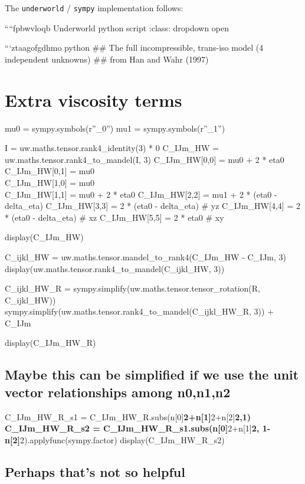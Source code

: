 \documentclass[
  letterpaper,
  DIV=11,
  numbers=noendperiod]{scrreprt}
\begin{document}
The \texttt{underworld} / \texttt{sympy} implementation follows:

````fpbwvloqb Underworld python script :class: dropdown open

```ztaagofgdhmo python \#\# The full incompressible, trans-iso model (4
independent unknowns) \#\# from Han and Wahr (1997)

\chapter{Extra viscosity terms}\label{extra-viscosity-terms}

mu0 = sympy.symbols(r''\mu\_0'') mu1 = sympy.symbols(r''\mu\_1'')

I = uw.maths.tensor.rank4\_identity(3) * 0 C\_IJm\_HW =
uw.maths.tensor.rank4\_to\_mandel(I, 3) C\_IJm\_HW{[}0,0{]} = mu0 + 2 *
eta0 C\_IJm\_HW{[}0,1{]} = mu0\\
C\_IJm\_HW{[}1,0{]} = mu0\\
C\_IJm\_HW{[}1,1{]} = mu0 + 2 * eta0 C\_IJm\_HW{[}2,2{]} = mu1 + 2 *
(eta0 - delta\_eta) C\_IJm\_HW{[}3,3{]} = 2 * (eta0 - delta\_eta) \# yz
C\_IJm\_HW{[}4,4{]} = 2 * (eta0 - delta\_eta) \# xz C\_IJm\_HW{[}5,5{]}
= 2 * eta0 \# xy

display(C\_IJm\_HW)

C\_ijkl\_HW = uw.maths.tensor.mandel\_to\_rank4(C\_IJm\_HW - C\_IJm, 3)
display(uw.maths.tensor.rank4\_to\_mandel(C\_ijkl\_HW, 3))

C\_ijkl\_HW\_R = sympy.simplify(uw.maths.tensor.tensor\_rotation(R,
C\_ijkl\_HW))
sympy.simplify(uw.maths.tensor.rank4\_to\_mandel(C\_ijkl\_HW\_R, 3)) +
C\_IJm

display(C\_IJm\_HW\_R)

\section{Maybe this can be simplified if we use the unit vector
relationships among
n0,n1,n2}\label{maybe-this-can-be-simplified-if-we-use-the-unit-vector-relationships-among-n0n1n2}

C\_IJm\_HW\_R\_s1 =
C\_IJm\_HW\_R.subs(n{[}0{]}\textbf{2+n{[}1{]}}2+n{[}2{]}\textbf{2,1)
C\_IJm\_HW\_R\_s2 = C\_IJm\_HW\_R\_s1.subs(n{[}0{]}}2+n{[}1{]}\textbf{2,
1-n{[}2{]}}2).applyfunc(sympy.factor) display(C\_IJm\_HW\_R\_s2)

\section{Perhaps that's not so
helpful}\label{perhaps-thats-not-so-helpful}
\end{document}
